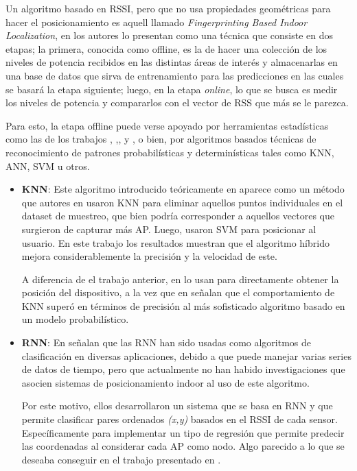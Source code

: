 \begin{enumerate}
{\begin{itemize}
{        Un algoritmo basado en \ac{RSSI}, pero que no usa propiedades geométricas para hacer el posicionamiento es aquell llamado \textit{Fingerprinting Based Indoor Localization}, en \cite{6} los autores lo presentan como una técnica que consiste en dos etapas; la primera, conocida como offline, es la de hacer una colección de los niveles de potencia recibidos en las distintas áreas de interés y almacenarlas en una base de datos que sirva de entrenamiento para las predicciones en las cuales se basará la etapa siguiente; luego, en la etapa \textit{online}, lo que se busca es medir los niveles de potencia y compararlos con el vector de \ac{RSS} que más se le parezca.
        
        Para esto, la etapa offline puede verse apoyado por herramientas estadísticas como las de los trabajos \cite{8}, \cite{10},\cite{11},\cite{12} y \cite{14}, o bien, por algoritmos basados técnicas de reconocimiento de patrones probabilísticas y determinísticas tales como KNN, ANN, SVM u otros.
        
        \begin{itemize}
            \item {\textbf{\ac{KNN}}: Este algoritmo introducido teóricamente en \cite{7} aparece como un método que autores en \cite{23} usaron KNN para eliminar aquellos puntos individuales en el dataset de muestreo, que bien podría corresponder a aquellos vectores que surgieron de capturar más AP. Luego, usaron SVM para posicionar al usuario. En este trabajo los resultados muestran que el algoritmo híbrido mejora considerablemente la precisión y la velocidad de este.
            
            A diferencia de el trabajo anterior, en \cite{24} lo usan para directamente obtener la posición del dispositivo, a la vez que en \cite{25} señalan que el comportamiento de KNN superó en términos de precisión al más sofisticado algoritmo basado en un modelo probabilístico.}
            
            \item {\textbf{\ac{RNN}}: \label{RNN} En \cite{15} señalan que las RNN han sido usadas como algoritmos de clasificación en diversas aplicaciones, debido a que puede manejar varias series de datos de tiempo, pero que actualmente no han habido investigaciones que asocien sistemas de posicionamiento indoor al uso de este algoritmo.
            
            Por este motivo, ellos desarrollaron un sistema que se basa en RNN y que permite clasificar pares ordenados \textit{(x,y)} basados en el RSSI de cada sensor. Específicamente para implementar un tipo de regresión que permite predecir las coordenadas al considerar cada AP como nodo. Algo parecido a lo que se deseaba conseguir en el trabajo presentado en \cite{28}.}
            

\end{itemize}}
\end{itemize}}
\end{enumerate}

